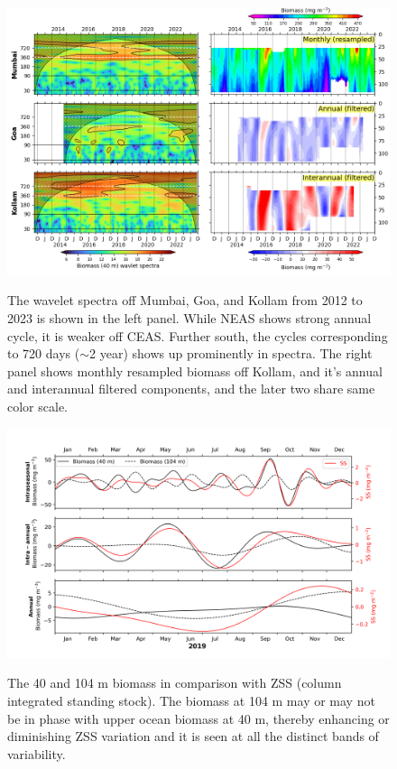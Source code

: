 \documentclass[authoryear,review,12pt]{elsarticle}
\newcounter{myfig} %
\begin{document}
\begin{figure}[htbp]
	\centering
	\includegraphics[width=\textwidth]{./figures/6kollam_annual_interannual_and_wavelet.png} 
	\captionsetup{justification=justified,font=footnotesize,skip=0.05\baselineskip,width=\textwidth}
	\caption{The wavelet spectra off Mumbai, Goa, and Kollam from 2012 to 2023 is shown in the left panel. While NEAS shows strong annual cycle, it is weaker off CEAS. Further south, the cycles corresponding to 720 days ($\sim$2 year) shows up prominently in spectra. The right panel shows monthly resampled biomass off Kollam, and it's annual and interannual filtered components, and the later two share same color scale.}
	\label{fig:interannual_variability}
	\label{myfig:b}
\end{figure}

\begin{figure}[htbp]
	\centering
	\includegraphics[width=\textwidth]{./figures/ss_biomass_comparison_intraseasonal_band.png} 
	\captionsetup{justification=justified,font=footnotesize,skip=0.05\baselineskip,width=\textwidth}
	\caption{The 40 and 104 m biomass in comparison with ZSS (column integrated standing stock). The biomass at 104 m may or may not be in phase with upper ocean biomass at 40 m, thereby enhancing or diminishing ZSS variation and it is seen at all the distinct bands of variability.}
	\label{fig:40_104_biomass_zss}
	\label{myfig:c}
\end{figure}
\end{document}
